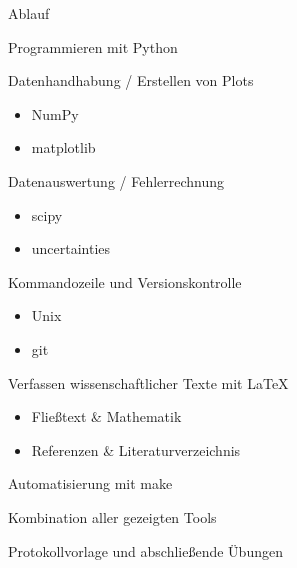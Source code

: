 \begin{frame}{Ablauf}
  \begin{description}
    \item[Montag] Programmieren mit Python
    \item[Dienstag] Datenhandhabung / Erstellen von Plots
      \begin{itemize}
        \item NumPy
        \item matplotlib
      \end{itemize}
    \item[Mittwoch] Datenauswertung / Fehlerrechnung
      \begin{itemize}
        \item scipy
        \item uncertainties
      \end{itemize}
    \item[Donnerstag] Kommandozeile und Versionskontrolle
      \begin{itemize}
        \item Unix
        \item git
      \end{itemize}
    \item[Nächste Woche] Verfassen wissenschaftlicher Texte mit \LaTeX{}
      \begin{itemize}
        \item Fließtext \& Mathematik
        \item Referenzen \& Literaturverzeichnis
      \end{itemize}
      \item Automatisierung mit make
      \item Kombination aller gezeigten Tools
      \item Protokollvorlage und abschließende Übungen
  \end{description}
\end{frame}
